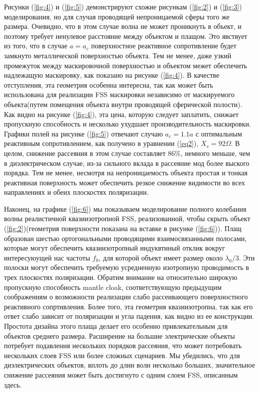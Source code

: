 \documentclass[12pt,a4paper]{article}
\begin{document}
Рисунки (\ref{fig:4}) и (\ref{fig:5}) демонстрируют схожие рисункам 
(\ref{fig:2}) и (\ref{fig:3})
моделирования, но для случая проводящей непроницаемой сферы того же размера. Очевидно, что
в этом случае волна не может проникнуть в объект, и поэтому требует ненулевое расстояние
между объектом и плащом. Это явствует из того, что в случае $a=a_c$ поверхностное реактивное
сопротивление будет замкнуто металлической поверхностью объекта. Тем не менее, даже узкий
промежуток между маскировочной поверхностью и объектом межет обеспечить надлежащую 
маскировку, как показано на рисунке (\ref{fig:4}). В качестве отступления, эта геометрия 
особенна интересна, так как может быть использована для реализации FSS маскировки
независимо от маскируемого объекта(путем помещения объекта внутри проводящей сферической 
полости). Как видно на рисунке (\ref{fig:4}), эта цена, которую следует заплатить, снижает
пропускную способность и несколько ухудшает производительность маскировки. Графики полей
на рисунке (\ref{fig:5}) отвечают случаю $a_c=1.1a$ с оптимальным реактивным сопротивлением,
как получено в уравнении (\ref{eq2}), $X_s=92\Omega$. В целом, снижение рассеяния в этом
случае составляет 86\%, немного меньше, чем в диэлектрическом случае, из-за сильного
вклада в рассеяние мод более выского порядка. Тем не менее, несмотря на непроницаемость 
объекта простая и тонкая реактивная поверхность может обеспечить резкое снижение видимости
во всех направлениях и обеих плоскостях поляризации.

Наконец, на графике (\ref{fig:6}) мы показываем моделирование полного колебания волны 
реалистичной квазиизотропной FSS, реализованной, чтобы скрыть объект (\ref{fig:2})(геометрия
поверхности показана на вставке в рисунке (\ref{fig:6})). Плащ образован шестью 
ортогональными
проводящими взаимосвязанными полосами, которые могут обеспечить квазиизотропный индуквтиный
отклик вокруг интересуюущей нас частоты $f_0$, для которой объект имеет размер около
$\lambda_0/3$. Эти полоски могут обеспечить требуемую усредненную изотропную проводимость
в трех плоскостях поляризации. Обратим внимание на относительно широкую пропускную 
способность mantle cloak, соответствующую предыдущим соображениям о возможности реализации
слабо рассеивающего поверхностного реактивного сопртивления. Более того, эта геометрия
квазиизотропна, так как его ответ слабо зависит от поляризации и угла падения, как видно
из ее конструкции. Простота дизайна этого плаща делает его особенно привлекательным для
объектов среднего размера. Расширение на большие электрические объекты потребует подавления
нескольких порядков рассеяния, что может потребовать нескольких слоев FSS или более сложных
сценариев. Мы убедились, что для диэлектрических объектов, вплоть до длин волн несколько
больших, значительное снижение рассеяния может быть достигнуто с одним слоем FSS, описанным
здесь.
\end{document}
